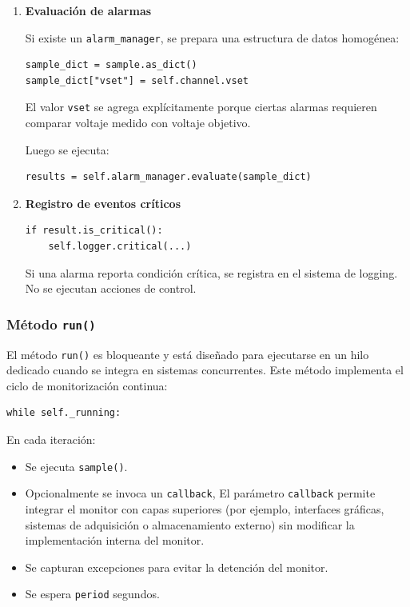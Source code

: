 \documentclass{article}
\begin{document}
\begin{enumerate}
\item \textbf{Evaluación de alarmas}

Si existe un \texttt{alarm\_manager}, se prepara una estructura de datos homogénea:

\begin{lstlisting}
sample_dict = sample.as_dict()
sample_dict["vset"] = self.channel.vset
\end{lstlisting}

El valor \texttt{vset} se agrega explícitamente porque ciertas alarmas requieren comparar voltaje medido con voltaje objetivo.

Luego se ejecuta:

\begin{lstlisting}
results = self.alarm_manager.evaluate(sample_dict)
\end{lstlisting}

\item \textbf{Registro de eventos críticos}

\begin{lstlisting}
if result.is_critical():
    self.logger.critical(...)
\end{lstlisting}

Si una alarma reporta condición crítica, se registra en el sistema de logging. 
No se ejecutan acciones de control.
    
\end{enumerate}

\subsubsection{Método \texttt{run()}}
El método \texttt{run()} es bloqueante y está diseñado para ejecutarse en un hilo dedicado cuando se integra en sistemas concurrentes.
Este método implementa el ciclo de monitorización continua:

\begin{lstlisting}
while self._running:
\end{lstlisting}

En cada iteración:

\begin{itemize}
    \item Se ejecuta \texttt{sample()}.
    \item Opcionalmente se invoca un \texttt{callback}, El parámetro \texttt{callback} permite integrar el monitor con capas superiores (por ejemplo, interfaces gráficas, sistemas de adquisición o almacenamiento externo) sin modificar la implementación interna del monitor.
    \item Se capturan excepciones para evitar la detención del monitor.
    \item Se espera \texttt{period} segundos.
\end{itemize}
\end{document}
